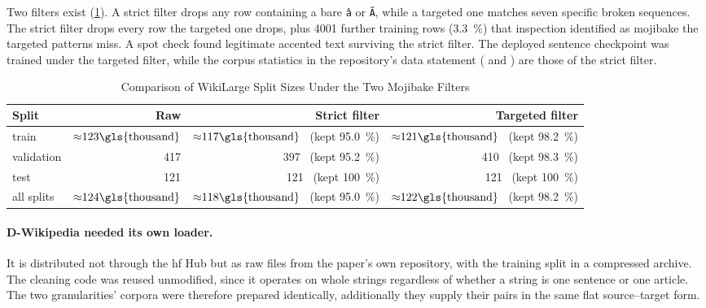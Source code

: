 Two filters exist (\cref{tab:corpus-rows}).
A strict filter drops any row containing a bare \texttt{\^{a}} or \texttt{\~{A}}, while a targeted one matches seven specific broken sequences.
The strict filter drops every row the targeted one drops, plus \num{4001} further training rows (\qty{3.3}{\percent}) that inspection identified as mojibake the targeted patterns miss.
A spot check found legitimate accented text surviving the strict filter.
The deployed sentence checkpoint was trained under the targeted filter, while the corpus statistics in the repository's data statement ( and ) are those of the strict filter.

\begin{table}[htbp]
	\centering
	\small
	\caption{Comparison of WikiLarge Split Sizes Under the Two Mojibake Filters}
	\label{tab:corpus-rows}
	\begin{tabular}{@{}lrrr@{}}
		\toprule
		\textbf{Split} & \textbf{Raw}                          & \textbf{Strict filter}                                              & \textbf{Targeted filter}                                            \\
		\midrule
		train          & \({\approx}123\text{\gls{thousand}}\) & \({\approx}117\text{\gls{thousand}}\) \ (kept \qty{95.0}{\percent}) & \({\approx}121\text{\gls{thousand}}\) \ (kept \qty{98.2}{\percent}) \\
		validation     & 417                                   & 397 \ (kept \qty{95.2}{\percent})                                   & 410 \ (kept \qty{98.3}{\percent})                                   \\
		test           & 121                                   & 121 \ (kept \qty{100}{\percent})                                    & 121 \ (kept \qty{100}{\percent})                                    \\
		\midrule
		all splits     & \({\approx}124\text{\gls{thousand}}\) & \({\approx}118\text{\gls{thousand}}\) \ (kept \qty{95.0}{\percent}) & \({\approx}122\text{\gls{thousand}}\) \ (kept \qty{98.2}{\percent}) \\
		\bottomrule
	\end{tabular}
\end{table}

\paragraph{D-Wikipedia needed its own loader.}
It is distributed not through the \gls{hf} Hub but as raw files from the paper's own repository, with the training split in a compressed archive.
The cleaning code was reused unmodified, since it operates on whole strings regardless of whether a string is one sentence or one article.
The two granularities' corpora were therefore prepared identically, additionally they supply their pairs in the same flat source--target form.

